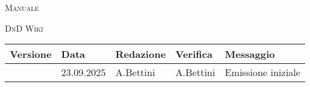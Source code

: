 \documentclass[
]{article}
\author{}
\date{}
\begin{document}
  \thispagestyle{firstpage}
	\centering
  {\Huge \textsc{}\par}
	\vspace{2cm}
  {\Huge \textsc{}\par}
	\vspace{2cm}
	{\fontsize{48}{50}\selectfont \textsc{Manuale}\par}
	\vspace{1cm}
	{\LARGE \textsc{DnD Wiki}\par}
	\vfill


\begin{longtable}[]{@{}lllll@{}}
\toprule\noalign{}
Versione & Data & Redazione & Verifica & Messaggio \\
\midrule\noalign{}
\endhead
\bottomrule\noalign{}
\endlastfoot
00 & 23.09.2025 & A.Bettini & A.Bettini & Emissione iniziale \\
\end{longtable}
\end{document}
